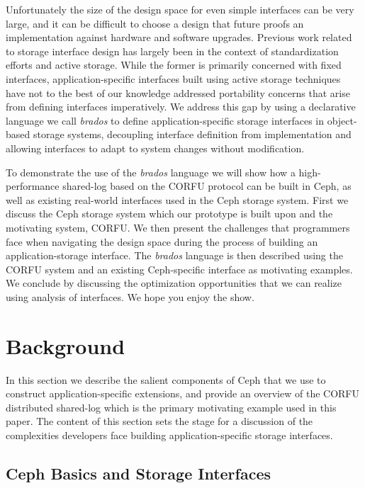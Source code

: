 \documentclass[10pt,twocolumn]{article}
\begin{document}
Unfortunately the size of the design space for even simple interfaces can
be very large, and it can be difficult to choose a design that future proofs an
implementation against hardware and software upgrades.
Previous work related to storage interface design has largely been in the
context of standardization efforts and active storage. While the former is
primarily concerned with fixed interfaces, application-specific interfaces
built using active storage techniques have not to the best of our knowledge
addressed portability concerns that arise from defining interfaces
imperatively. We address this gap by using a declarative language we call
\emph{brados} to define application-specific storage interfaces in
object-based storage systems, decoupling interface definition from
implementation and allowing interfaces to adapt to system changes without
modification.

To demonstrate the use of the \emph{brados} language we will show how a
high-performance shared-log based on the CORFU protocol can be built in Ceph, as well
as existing real-world interfaces used in the Ceph storage system. First we
discuss the Ceph storage system which our prototype is built upon and the 
motivating system, CORFU. We then present the challenges that programmers face
when navigating the design space during the process of building an
application-storage interface. The \emph{brados} language is then described
using the CORFU system and an existing Ceph-specific interface as motivating examples.
We conclude by discussing the optimization opportunities that we can realize
using analysis of interfaces. We hope you enjoy the show.

\section{Background}

In this section we describe the salient components of Ceph that we use to
construct application-specific extensions, and provide an overview of the
CORFU distributed shared-log which is the primary motivating example used in
this paper. The content of this section sets the stage for a discussion of the
complexities developers face building application-specific storage interfaces.

\subsection{Ceph Basics and Storage Interfaces}
\label{sec:objclass}
\end{document}
